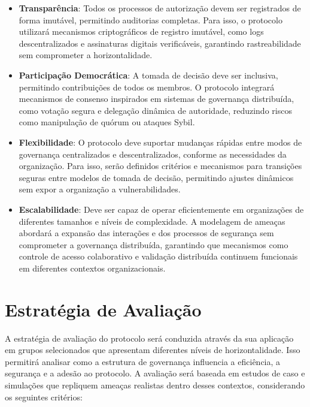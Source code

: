 \begin{itemize}

    \item \textbf{Transparência}: Todos os processos de autorização devem ser
registrados de forma imutável, permitindo auditorias completas. Para isso, o
protocolo utilizará mecanismos criptográficos de registro imutável, como logs
descentralizados e assinaturas digitais verificáveis, garantindo rastreabilidade
sem comprometer a horizontalidade.
    
    \item \textbf{Participação Democrática}: A tomada de decisão deve ser
inclusiva, permitindo contribuições de todos os membros. O protocolo integrará
mecanismos de consenso inspirados em sistemas de governança distribuída, como
votação segura e delegação dinâmica de autoridade, reduzindo riscos como
manipulação de quórum ou ataques Sybil.
    
    \item \textbf{Flexibilidade}: O protocolo deve suportar mudanças rápidas
entre modos de governança centralizados e descentralizados, conforme as
necessidades da organização. Para isso, serão definidos critérios e mecanismos
para transições seguras entre modelos de tomada de decisão, permitindo ajustes
dinâmicos sem expor a organização a vulnerabilidades.
    
    \item \textbf{Escalabilidade}: Deve ser capaz de operar eficientemente em
organizações de diferentes tamanhos e níveis de complexidade. A modelagem de
ameaças abordará a expansão das interações e dos processos de segurança sem
comprometer a governança distribuída, garantindo que mecanismos como controle de
acesso colaborativo e validação distribuída continuem funcionais em diferentes
contextos organizacionais.

\end{itemize}

\section{Estratégia de Avaliação}
\label{sec:evaluation_strategy}

A estratégia de avaliação do protocolo será conduzida através da sua aplicação
em grupos selecionados que apresentam diferentes níveis de horizontalidade. Isso
permitirá analisar como a estrutura de governança influencia a eficiência, a
segurança e a adesão ao protocolo. A avaliação será baseada em estudos de caso e
simulações que repliquem ameaças realistas dentro desses contextos, considerando
os seguintes critérios:

